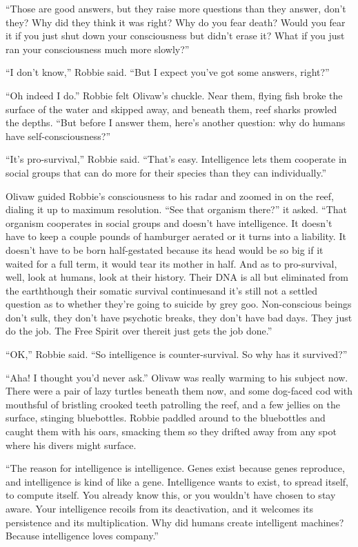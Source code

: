 “Those are good answers, but they raise more questions than they
answer, don’t they? Why did they think it was right? Why do you
fear death? Would you fear it if you just shut down your
consciousness but didn’t erase it? What if you just ran your
consciousness much more slowly?”

“I don’t know,” Robbie said. “But I expect you’ve got some answers,
right?”

“Oh indeed I do.” Robbie felt Olivaw’s chuckle. Near them, flying
fish broke the surface of the water and skipped away, and beneath
them, reef sharks prowled the depths. “But before I answer them,
here’s another question: why do humans have self-consciousness?”

“It’s pro-survival,” Robbie said. “That’s easy. Intelligence lets
them cooperate in social groups that can do more for their species
than they can individually.”

Olivaw guided Robbie’s consciousness to his radar and zoomed in on
the reef, dialing it up to maximum resolution. “See that organism
there?” it asked. “That organism cooperates in social groups and
doesn’t have intelligence. It doesn’t have to keep a couple pounds
of hamburger aerated or it turns into a liability. It doesn’t have
to be born half-gestated because its head would be so big if it
waited for a full term, it would tear its mother in half. And as to
pro-survival, well, look at humans, look at their history. Their
DNA is all but eliminated from the earth\dash{}though their somatic
survival continues\dash{}and it’s still not a settled question as to
whether they’re going to suicide by grey goo. Non-conscious beings
don’t sulk, they don’t have psychotic breaks, they don’t have bad
days. They just do the job. The Free Spirit over there\dash{}it just gets
the job done.”

“OK,” Robbie said. “So intelligence is counter-survival. So why has
it survived?”

“Aha! I thought you’d never ask.” Olivaw was really warming to his
subject now. There were a pair of lazy turtles beneath them now,
and some dog-faced cod with mouthsful of bristling crooked teeth
patrolling the reef, and a few jellies on the surface, stinging
bluebottles. Robbie paddled around to the bluebottles and caught
them with his oars, smacking them so they drifted away from any
spot where his divers might surface.

“The reason for intelligence is intelligence. Genes exist because
genes reproduce, and intelligence is kind of like a gene.
Intelligence wants to exist, to spread itself, to compute itself.
You already know this, or you wouldn’t have chosen to stay aware.
Your intelligence recoils from its deactivation, and it welcomes
its persistence and its multiplication. Why did humans create
intelligent machines? Because intelligence loves company.”


